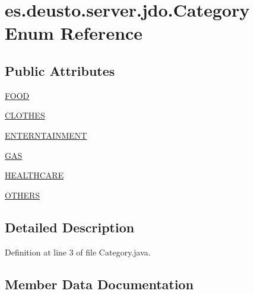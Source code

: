 \hypertarget{enumes_1_1deusto_1_1server_1_1jdo_1_1_category}{}\section{es.\+deusto.\+server.\+jdo.\+Category Enum Reference}
\label{enumes_1_1deusto_1_1server_1_1jdo_1_1_category}
\subsection*{Public Attributes}
\begin{DoxyCompactItemize}
\item 
\hyperlink{enumes_1_1deusto_1_1server_1_1jdo_1_1_category_aaeab5efd94749e3fbed17d4653090589}{F\+O\+OD}
\item 
\hyperlink{enumes_1_1deusto_1_1server_1_1jdo_1_1_category_aaa8d45c131dc385447328bf41d2cf906}{C\+L\+O\+T\+H\+ES}
\item 
\hyperlink{enumes_1_1deusto_1_1server_1_1jdo_1_1_category_ac2cf56f48a58629b75b917be8b3b8df6}{E\+N\+T\+E\+R\+N\+T\+A\+I\+N\+M\+E\+NT}
\item 
\hyperlink{enumes_1_1deusto_1_1server_1_1jdo_1_1_category_a8e8f689ee2c51a9b970eeb94d68e60bb}{G\+AS}
\item 
\hyperlink{enumes_1_1deusto_1_1server_1_1jdo_1_1_category_af004d7610b5df9d78bb287f732f0df1e}{H\+E\+A\+L\+T\+H\+C\+A\+RE}
\item 
\hyperlink{enumes_1_1deusto_1_1server_1_1jdo_1_1_category_a02964f033697863ad1fb73d197c7db9d}{O\+T\+H\+E\+RS}
\end{DoxyCompactItemize}


\subsection{Detailed Description}


Definition at line 3 of file Category.\+java.



\subsection{Member Data Documentation}
\mbox{\label{enumes_1_1deusto_1_1server_1_1jdo_1_1_category_aaa8d45c131dc385447328bf41d2cf906}} 
